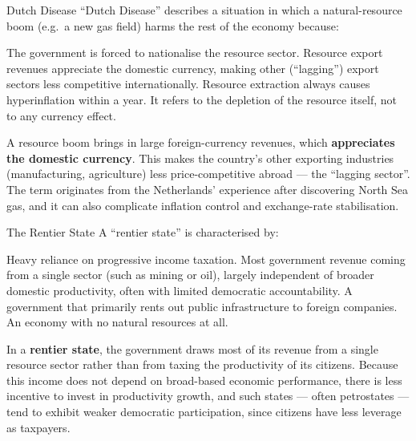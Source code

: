 \begin{question}[type=mc]{Dutch Disease}
``Dutch Disease'' describes a situation in which a natural-resource boom
(e.g.\ a new gas field) harms the rest of the economy because:
\begin{choices}
  \choice        The government is forced to nationalise the resource sector.
  \correctchoice Resource export revenues appreciate the domestic currency,
                 making other (``lagging'') export sectors less competitive
                 internationally.
  \choice        Resource extraction always causes hyperinflation within a
                 year.
  \choice        It refers to the depletion of the resource itself, not to
                 any currency effect.
\end{choices}
\begin{solution}
  A resource boom brings in large foreign-currency revenues, which
  \textbf{appreciates the domestic currency}. This makes the country's other
  exporting industries (manufacturing, agriculture) less price-competitive
  abroad --- the ``lagging sector''. The term originates from the
  Netherlands' experience after discovering North Sea gas, and it can also
  complicate inflation control and exchange-rate stabilisation.
\end{solution}
\end{question}

\begin{question}[type=mc]{The Rentier State}
A ``rentier state'' is characterised by:
\begin{choices}
  \choice        Heavy reliance on progressive income taxation.
  \correctchoice Most government revenue coming from a single sector (such as
                 mining or oil), largely independent of broader domestic
                 productivity, often with limited democratic accountability.
  \choice        A government that primarily rents out public infrastructure
                 to foreign companies.
  \choice        An economy with no natural resources at all.
\end{choices}
\begin{solution}
  In a \textbf{rentier state}, the government draws most of its revenue from
  a single resource sector rather than from taxing the productivity of its
  citizens. Because this income does not depend on broad-based economic
  performance, there is less incentive to invest in productivity growth, and
  such states --- often petrostates --- tend to exhibit weaker democratic
  participation, since citizens have less leverage as taxpayers.
\end{solution}
\end{question}

